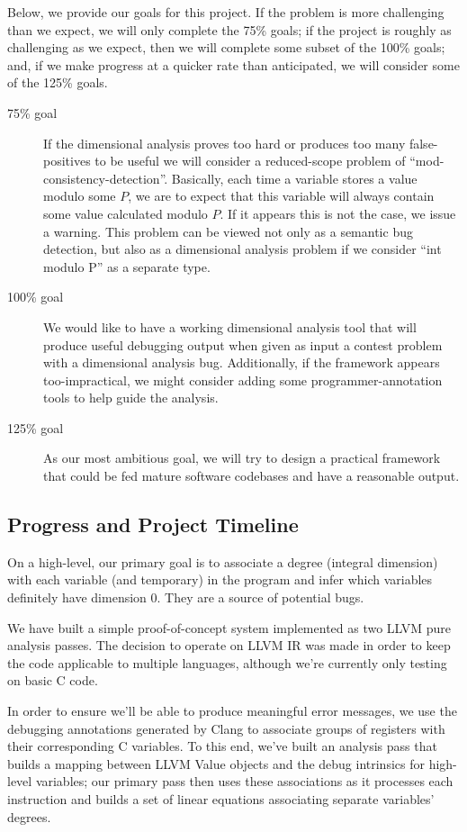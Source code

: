 \documentclass[12pt]{article}
\begin{document}
Below, we provide our goals for this project. If the problem is more challenging than we expect, we will only complete the 75\% goals; if the project is roughly as challenging as we expect, then we will complete some subset of the 100\% goals; and, if we make progress at a quicker rate than anticipated, we will consider some of the 125\% goals.
\begin{description}
\item [75\% goal] If the dimensional analysis proves too hard or produces too many false-positives to be useful we will consider a reduced-scope problem of ``mod-consistency-detection''. Basically, each time a variable stores a value modulo some $P$, we are to expect that this variable will always contain some value calculated modulo $P$. If it appears this is not the case, we issue a warning. This problem can be viewed not only as a semantic bug detection, but also as a dimensional analysis problem if we consider ``int modulo P'' as a separate type.

\item [100\% goal] We would like to have a working dimensional analysis tool that will produce useful debugging output when given as input a contest problem with a dimensional analysis bug. Additionally, if the framework appears too-impractical, we might consider adding some programmer-annotation tools to help guide the analysis. 

\item [125\% goal] As our most ambitious goal, we will try to design a practical framework that could be fed mature software codebases and have a reasonable output.
\end{description}

\subsection{Progress and Project Timeline}

On a high-level, our primary goal is to associate a degree (integral dimension) with each variable (and temporary) in the program and infer which variables definitely have dimension 0. They are a source of potential bugs.

We have built a simple proof-of-concept system implemented as two LLVM pure analysis passes.
The decision to operate on LLVM IR was made in order to keep the code applicable to multiple languages, although we're currently only testing on basic C code.

In order to ensure we'll be able to produce meaningful error messages, we use the debugging annotations generated by Clang to associate groups of registers with their corresponding C variables.
To this end, we've built an analysis pass that builds a mapping between LLVM Value objects and the debug intrinsics for high-level variables; our primary pass then uses these associations as it processes each instruction and builds a set of linear equations associating separate variables' degrees.
\end{document}
